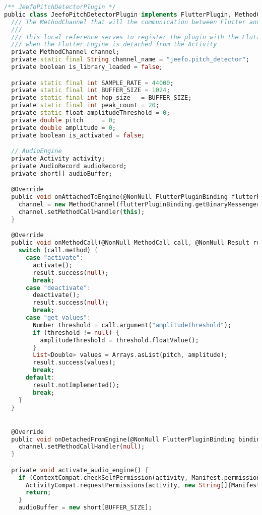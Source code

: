 \begin{lstlisting}[language=Dart, caption=Java хэл дахь FFT хэрэгжүүлэлт, frame=single]
/** JeefoPitchDetectorPlugin */
public class JeefoPitchDetectorPlugin implements FlutterPlugin, MethodCallHandler, ActivityAware, PluginRegistry.RequestPermissionsResultListener {
  /// The MethodChannel that will the communication between Flutter and native Android
  ///
  /// This local reference serves to register the plugin with the Flutter Engine and unregister it
  /// when the Flutter Engine is detached from the Activity
  private MethodChannel channel;
  private static final String channel_name = "jeefo.pitch_detector";
  private boolean is_library_loaded = false;

  private static final int SAMPLE_RATE = 44000;
  private static final int BUFFER_SIZE = 1024;
  private static final int hop_size   = BUFFER_SIZE;
  private static final int peak_count = 20;
  private static float amplitudeThreshold = 0;
  private double pitch     = 0;
  private double amplitude = 0;
  private boolean is_activated = false;

  // AudioEngine
  private Activity activity;
  private AudioRecord audioRecord;
  private short[] audioBuffer;

  @Override
  public void onAttachedToEngine(@NonNull FlutterPluginBinding flutterPluginBinding) {
    channel = new MethodChannel(flutterPluginBinding.getBinaryMessenger(), channel_name);
    channel.setMethodCallHandler(this);
  }

  @Override
  public void onMethodCall(@NonNull MethodCall call, @NonNull Result result) {
    switch (call.method) {
      case "activate":
        activate();
        result.success(null);
        break;
      case "deactivate":
        deactivate();
        result.success(null);
        break;
      case "get_values":
        Number threshold = call.argument("amplitudeThreshold");
        if (threshold != null) {
          amplitudeThreshold = threshold.floatValue();
        }
        List<Double> values = Arrays.asList(pitch, amplitude);
        result.success(values);
        break;
      default:
        result.notImplemented();
        break;
    }
  }


  @Override
  public void onDetachedFromEngine(@NonNull FlutterPluginBinding binding) {
    channel.setMethodCallHandler(null);
  }

  private void activate_audio_engine() {
    if (ContextCompat.checkSelfPermission(activity, Manifest.permission.RECORD_AUDIO) != PackageManager.PERMISSION_GRANTED) {
      ActivityCompat.requestPermissions(activity, new String[]{Manifest.permission.RECORD_AUDIO}, 1);
      return;
    }
    audioBuffer = new short[BUFFER_SIZE];


\end{lstlisting}
